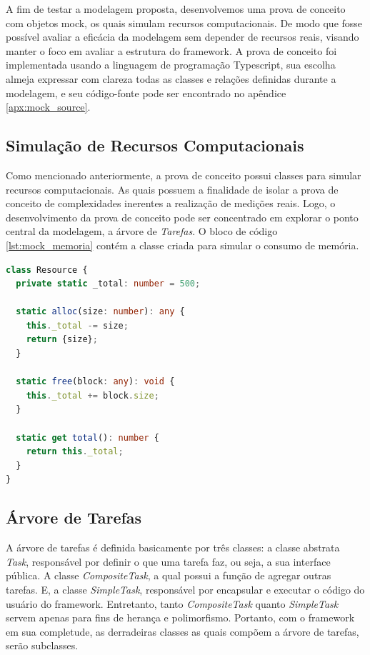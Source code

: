 \documentclass[12pt]{tcc}
\begin{document}
A fim de testar a modelagem proposta, desenvolvemos uma prova de conceito com objetos mock, os quais simulam recursos computacionais.
De modo que fosse possível avaliar a eficácia da modelagem sem depender de recursos reais, visando manter o foco em avaliar a estrutura do framework.
A prova de conceito foi implementada usando a linguagem de programação Typescript, sua escolha almeja expressar com clareza todas as classes e relações definidas durante a modelagem, e seu código-fonte pode ser encontrado no apêndice \ref{apx:mock_source}.


\subsection{Simulação de Recursos Computacionais}
Como mencionado anteriormente, a prova de conceito possui classes para simular recursos computacionais.
As quais possuem a finalidade de isolar a prova de conceito de complexidades inerentes a realização de medições reais.
Logo, o desenvolvimento da prova de conceito pode ser concentrado em explorar o ponto central da modelagem, a árvore de \emph{Tarefas}.
O bloco de código \ref{lst:mock_memoria} contém a classe criada para simular o consumo de memória.

\begin{lstlisting}[label={lst:mock_memoria}, caption={Implementação da classe responsável por simular recursos de memória para a prova de conceito do framework.}, language=TypeScript]
class Resource {
  private static _total: number = 500;

  static alloc(size: number): any {
    this._total -= size;
    return {size};
  }

  static free(block: any): void {
    this._total += block.size;
  }

  static get total(): number {
    return this._total;
  }
}
\end{lstlisting}


\subsection{Árvore de Tarefas}
\label{task-tree}

A árvore de tarefas é definida basicamente por três classes:
a classe abstrata \emph{Task}, responsável por definir o que uma tarefa faz, ou seja, a sua interface pública.
A classe \emph{CompositeTask}, a qual possui a função de agregar outras tarefas.
E, a classe \emph{SimpleTask}, responsável por encapsular e executar o código do usuário do framework.
Entretanto, tanto \emph{CompositeTask} quanto \emph{SimpleTask} servem apenas para fins de herança e polimorfismo.
Portanto, com o framework em sua completude, as derradeiras classes as quais compõem a árvore de tarefas, serão subclasses.
\end{document}
